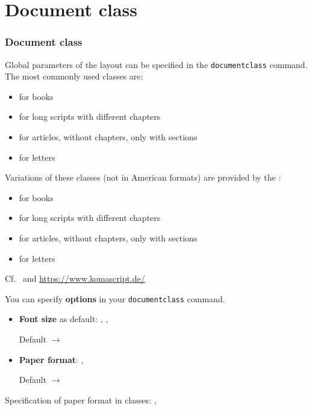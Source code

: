 \section{Document class}

\begin{frame}[fragile]
\frametitle{Document class}

Global parameters of the layout can be specified in the \lstinline|documentclass| command. The most commonly used classes are:
 
\begin{itemize}
	\item {} for books
	\item {} for long scripts with different chapters
	\item {} for articles, without chapters, only with sections
	\item {} for letters
\end{itemize}

Variations of these classes (not in American formats) are provided by the \textbf{}:

\begin{itemize}
	\item {} for books
	\item {} for long scripts with different chapters
	\item \alert{} for articles, without chapters, only with sections
	\item {} for letters
\end{itemize}

Cf.\ \citet{Kohm&Co13a} and \url{https://www.komascript.de/}

\end{frame}


\begin{frame}[fragile]

You can specify \textbf{options} in your \lstinline|documentclass| command.

\begin{itemize}
	\item \textbf{Font size} as default: \ltxterm{10pt}, \ltxterm{11pt}, \ltxterm{12pt} \par
	Default $\rightarrow$ \ltxterm{10pt} 
	
	\item \textbf{Paper format}: ,  \par
	Default $\rightarrow$ 

\end{itemize}

Specification of paper format in  classes: ,  

\end{frame}


